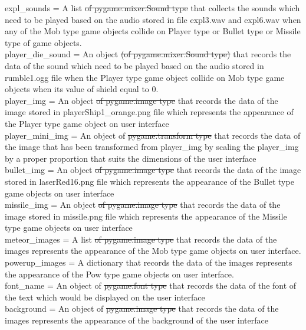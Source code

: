 \documentclass[12pt, titlepage]{article}
\begin{document}
\newline
expl\_sounds = A list \sout{of pygame.mixer.Sound type} that collects the sounds which need to be played based on the audio stored in file expl3.wav and expl6.wav when any of the Mob type game objects collide on Player type or Bullet type or Missile type of game objects. \\
\newline
player\_die\_sound = An object \sout{(of pygame.mixer.Sound type)} that records the data of the sound which need to be played based on the audio stored in rumble1.ogg file when the Player type game object collide on Mob type game objects when its value of shield equal to 0. \\
\newline
player\_img = An object \sout{of pygame.image type} that records the data of the image stored in playerShip1\_orange.png file which represents the appearance of the Player type game object on user interface \\ 
\newline
player\_mini\_img = An object of \sout{pygame.transform type} that records the data of the image that has been transformed from player\_img by scaling the player\_img by a proper proportion that suits the dimensions of the user interface \\
\newline
bullet\_img = An object \sout{of pygame.image type} that records the data of the image stored in laserRed16.png file which represents the appearance of the Bullet type game objects on user interface \\
\newline
missile\_img = An object \sout{of pygame.image type} that records the data of the image stored in missile.png file which represents the appearance of the Missile type game objects on user interface \\
\newline
meteor\_images = A list \sout{of pygame.image type} that records the data of the images represents the appearance of the Mob type game objects on user interface. \\
\newline
powerup\_images = A dictionary that records the data of the images represents the appearance of the Pow type game objects on user interface. \\
\newline 
font\_name = An object of \sout{pygame.font type} that records the data of the font of the text which would be displayed on the user interface \\
\newline
background = An object of \sout{pygame.image type} that records the data of the images represents the appearance of the background of the user interface \\
\end{document}
